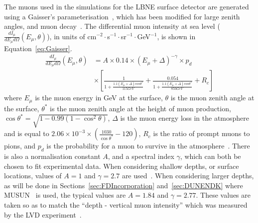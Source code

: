 The muons used in the simulations for the LBNE surface detector are generated using a Gaisser's parameterisation~\citep{Gaisser}, which has been modified for large zenith angles, and muon decay~\citep{PhysRevD.58.092005}. The differential muon intensity at sea level ($\frac{dI_{\mu}}{dE_{\mu} d\Omega}(E_{\mu}, \theta)$), in units of cm$^{-2}\cdot$s$^{-1}\cdot$sr$^{-1}\cdot$GeV$^{-1}$, is shown in Equation~\ref{eq:Gaisser}.
\begin{equation}
   \begin{aligned}
      \label{eq:Gaisser}
      \frac{dI_{\mu}}{dE_{\mu} d\Omega}(E_{\mu}, \theta) &=
      A \times 0.14\times (E_{\mu} + \Delta)^{-\gamma} \times p_{d} \\
      &\times \left[ \frac{1}{1 + \frac{ 1.1(E_{\mu}+\Delta)cos\theta^{*} }{ 115 GeV } } +
      \frac{0.054}{1 + \frac{1.1(E_{\mu}+\Delta)cos\theta^{*}}{850 GeV}} + R_{c} \right]
   \end{aligned}
\end{equation} 
where $E_{\mu}$ is the muon energy in GeV at the surface, $\theta$ is the muon zenith angle at the surface, $\theta^{*}$ is the muon zenith angle at the height of muon production, $\cos\theta^{*} = \sqrt{1-0.99(1-\cos^{2}\theta)}$, $\Delta$ is the muon energy loss in the atmosphere and is equal to $2.06\times10^{-3} \times \left(\frac{1030}{\cos\theta^{*}} - 120 \right)$, $R_{c}$ is the ratio of prompt muons to pions, and $p_d$ is the probability for a muon to survive in the atmosphere~\citep{PhysRevLett.51.227}. There is also a normalisation constant $A$, and a spectral index $\gamma$, which can both be chosen to fit experimental data. When considering shallow depths, or surface locations, values of $A=1$ and $\gamma=2.7$ are used~\citep{Gaisser}. When considering larger depths, as will be done in Sections~\ref{sec:FDIncorporation} and~\ref{sec:DUNENDK} where MUSUN~\citep{MUSUN, MUSUN2} is used, the typical values are $A=1.84$ and $\gamma=2.77$. These values are taken so as to match the ``depth - vertical muon intensity'' which was measured by the LVD experiment~\citep{PhysRevD.58.092005}. \\

